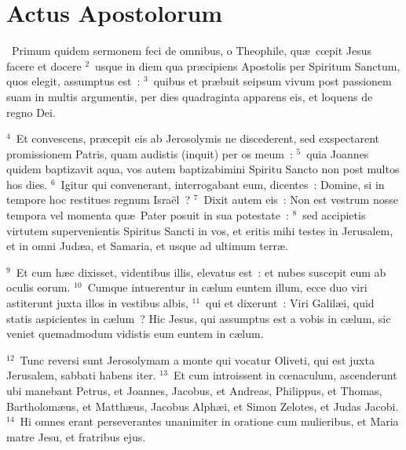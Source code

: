 \clearpage
{\centering \section*{Actus Apostolorum}}\thispagestyle{empty}

~Primum quidem sermonem feci de omnibus, o Theophile, qu\ae\ cœpit Jesus facere et docere
${}^{2}$~usque in diem qua pr\ae cipiens Apostolis per Spiritum Sanctum, quos elegit, assumptus est~:
${}^{3}$~quibus et pr\ae buit seipsum vivum post passionem suam in multis argumentis, per dies quadraginta apparens eis, et loquens de regno Dei.


${}^{4}$~Et convescens, pr\ae cepit eis ab Jerosolymis ne discederent, sed exspectarent promissionem Patris, quam audistis (inquit) per os meum~:
${}^{5}$~quia Joannes quidem baptizavit aqua, vos autem baptizabimini Spiritu Sancto non post multos hos dies.
${}^{6}$~Igitur qui convenerant, interrogabant eum, dicentes~: Domine, si in tempore hoc restitues regnum Isra\"el~?
${}^{7}$~Dixit autem eis~: Non est vestrum nosse tempora vel momenta qu\ae\ Pater posuit in sua potestate~:
${}^{8}$~sed accipietis virtutem supervenientis Spiritus Sancti in vos, et eritis mihi testes in Jerusalem, et in omni Jud\ae a, et Samaria, et usque ad ultimum terr\ae .


${}^{9}$~Et cum h\ae c dixisset, videntibus illis, elevatus est~: et nubes suscepit eum ab oculis eorum.
${}^{10}$~Cumque intuerentur in c\ae lum euntem illum, ecce duo viri astiterunt juxta illos in vestibus albis,
${}^{11}$~qui et dixerunt~: Viri Galil\ae i, quid statis aspicientes in c\ae lum~? Hic Jesus, qui assumptus est a vobis in c\ae lum, sic veniet quemadmodum vidistis eum euntem in c\ae lum.


${}^{12}$~Tunc reversi sunt Jerosolymam a monte qui vocatur Oliveti, qui est juxta Jerusalem, sabbati habens iter.
${}^{13}$~Et cum introissent in cœnaculum, ascenderunt ubi manebant Petrus, et Joannes, Jacobus, et Andreas, Philippus, et Thomas, Bartholom\ae us, et Matth\ae us, Jacobus Alph\ae i, et Simon Zelotes, et Judas Jacobi.
${}^{14}$~Hi omnes erant perseverantes unanimiter in oratione cum mulieribus, et Maria matre Jesu, et fratribus ejus.


